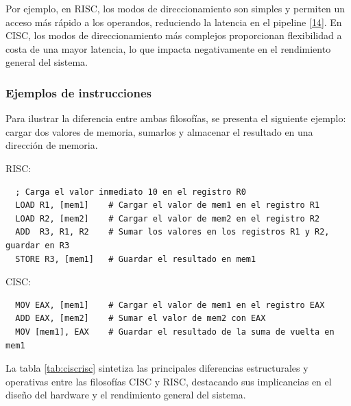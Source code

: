\documentclass[12pt,oneside]{templates/unerthesis}
\begin{document}
Por ejemplo, en RISC, los modos de direccionamiento son simples y permiten un acceso más rápido a los operandos, reduciendo la latencia en el pipeline \protect\hyperlink{ref-stallings_computer_2021}{{[}14{]}}. En CISC, los modos de direccionamiento más complejos proporcionan flexibilidad a costa de una mayor latencia, lo que impacta negativamente en el rendimiento general del sistema.

\hypertarget{ejemplos-de-instrucciones}{%
\subsubsection{Ejemplos de instrucciones}\label{ejemplos-de-instrucciones}}

Para ilustrar la diferencia entre ambas filosofías, se presenta el siguiente ejemplo: cargar dos valores de memoria, sumarlos y almacenar el resultado en una dirección de memoria.

RISC:

\begin{lstlisting}
  ; Carga el valor inmediato 10 en el registro R0
  LOAD R1, [mem1]    # Cargar el valor de mem1 en el registro R1
  LOAD R2, [mem2]    # Cargar el valor de mem2 en el registro R2
  ADD  R3, R1, R2    # Sumar los valores en los registros R1 y R2, guardar en R3
  STORE R3, [mem1]   # Guardar el resultado en mem1
  \end{lstlisting}

CISC:

\begin{lstlisting}
  MOV EAX, [mem1]    # Cargar el valor de mem1 en el registro EAX
  ADD EAX, [mem2]    # Sumar el valor de mem2 con EAX
  MOV [mem1], EAX    # Guardar el resultado de la suma de vuelta en mem1
  \end{lstlisting}

La tabla \ref{tab:ciscrisc} sintetiza las principales diferencias estructurales y operativas entre las filosofías CISC y RISC, destacando sus implicancias en el diseño del hardware y el rendimiento general del sistema.
\end{document}
